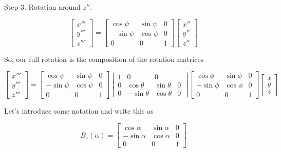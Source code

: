 Step 3.  Rotation around $z''$.

\begin{equation}\label{eqn:classicalMechanicsEulerAngles:60}
\begin{bmatrix}
x''' \\
y''' \\
z'''
\end{bmatrix}
=
\begin{bmatrix}
\cos\psi & \sin\psi & 0 \\
-\sin\psi & \cos\psi & 0 \\
0 & 0 & 1
\end{bmatrix}
\begin{bmatrix}
x'' \\
y'' \\
z''
\end{bmatrix}
\end{equation}

So, our full rotation is the composition of the rotation matrices

\begin{equation}\label{eqn:classicalMechanicsEulerAngles:80}
\begin{bmatrix}
x''' \\
y''' \\
z'''
\end{bmatrix}
=
\begin{bmatrix}
\cos\psi & \sin\psi & 0 \\
-\sin\psi & \cos\psi & 0 \\
0 & 0 & 1
\end{bmatrix}
\begin{bmatrix}
1 & 0 & 0 \\
0 & \cos\theta & \sin\theta & 0 \\
0 & -\sin\theta & \cos\theta & 0 
\end{bmatrix}
\begin{bmatrix}
\cos\phi & \sin\phi & 0 \\
-\sin\phi & \cos\phi & 0 \\
0 & 0 & 1
\end{bmatrix}
\begin{bmatrix}
x \\
y \\
z
\end{bmatrix}
\end{equation}

Let's introduce some notation and write this as

\begin{equation}\label{eqn:classicalMechanicsEulerAngles:100}
B_z(\alpha)
=
\begin{bmatrix}
\cos\alpha & \sin\alpha & 0 \\
-\sin\alpha & \cos\alpha & 0 \\
0 & 0 & 1
\end{bmatrix}
\end{equation}

